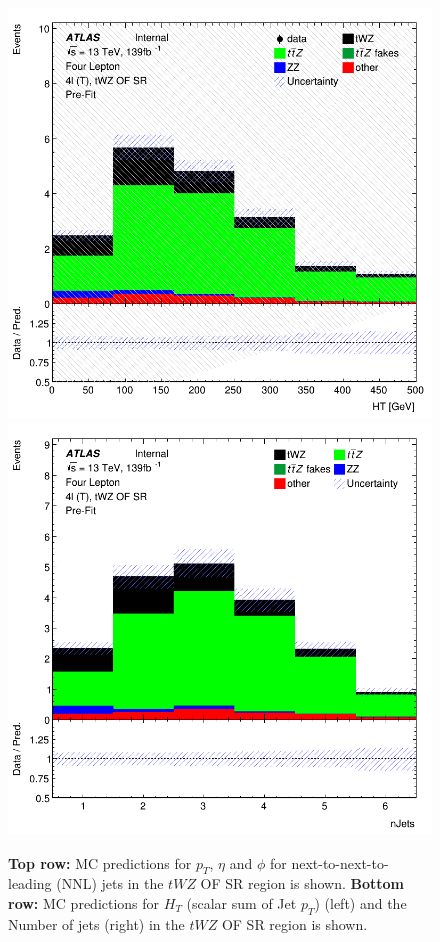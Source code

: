 \begin{figure}[htbp]
    \includegraphics[width=.3\textwidth]{figures/PreFitPlots/lep4_tWZ_4T_OF_HT.png}   \quad
    \includegraphics[width=.3\textwidth]{figures/PreFitPlots/lep4_tWZ_4T_OF_Num_Jets.png}

    \caption{\textbf{Top row:} MC predictions for $p_{T}$, $\eta$ and $\phi$ for next-to-next-to-leading (NNL) jets in the $tWZ$ OF SR region  is shown. \textbf{Bottom row:} MC predictions for $H_{T}$ (scalar sum of Jet $p_{T}$) (left) and the Number of jets (right) in the $tWZ$ OF SR region  is shown.}
    \label{fig:4lep-OF-SR-NNLjetPlots} 
\end{figure}



